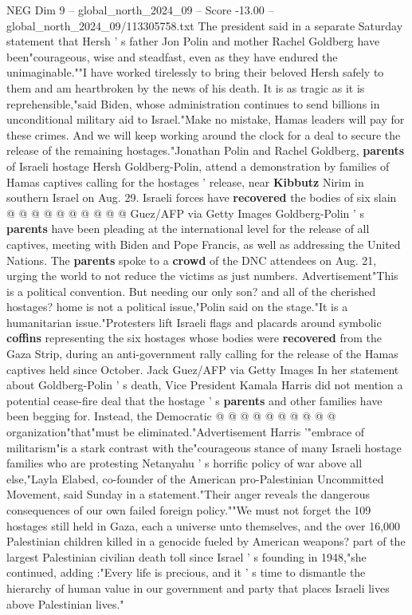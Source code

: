 \begin{textsample}{NEG Dim 9 – global\_north\_2024\_09 – Score -13.00 – global\_north\_2024\_09/113305758.txt}
The president said in a separate Saturday statement that Hersh ' s father Jon Polin and mother Rachel Goldberg have been"courageous, wise and steadfast, even as they have endured the unimaginable.""I have worked tirelessly to bring their beloved Hersh safely to them and am heartbroken by the news of his death.
It is as tragic as it is reprehensible,"said Biden, whose administration continues to send billions in unconditional military aid to Israel."Make no mistake, Hamas leaders will pay for these crimes.
And we will keep working around the clock for a deal to secure the release of the remaining hostages."Jonathan Polin and Rachel Goldberg, \textbf{parents} of Israeli hostage Hersh Goldberg-Polin, attend a demonstration by families of Hamas captives calling for the hostages ' release, near \textbf{Kibbutz} Nirim in southern Israel on Aug. 29.
Israeli forces have \textbf{recovered} the bodies of six slain @ @ @ @ @ @ @ @ @ @ Guez/AFP via Getty Images Goldberg-Polin ' s \textbf{parents} have been pleading at the international level for the release of all captives, meeting with Biden and Pope Francis, as well as addressing the United Nations.
The \textbf{parents} spoke to a \textbf{crowd} of the DNC attendees on Aug. 21, urging the world to not reduce the victims as just numbers.
Advertisement"This is a political convention.
But needing our only son? and all of the cherished hostages? home is not a political issue,"Polin said on the stage."It is a humanitarian issue."Protesters lift Israeli flags and placards around symbolic \textbf{coffins} representing the six hostages whose bodies were \textbf{recovered} from the Gaza Strip, during an anti-government rally calling for the release of the Hamas captives held since October.
Jack Guez/AFP via Getty Images In her statement about Goldberg-Polin ' s death, Vice President Kamala Harris did not mention a potential cease-fire deal that the hostage ' s \textbf{parents} and other families have been begging for.
Instead, the Democratic @ @ @ @ @ @ @ @ @ @ organization"that"must be eliminated."Advertisement Harris '"embrace of militarism"is a stark contrast with the"courageous stance of many Israeli hostage families who are protesting Netanyahu ' s horrific policy of war above all else,"Layla Elabed, co-founder of the American pro-Palestinian Uncommitted Movement, said Sunday in a statement."Their anger reveals the dangerous consequences of our own failed foreign policy.""We must not forget the 109 hostages still held in Gaza, each a universe unto themselves, and the over 16,000 Palestinian children killed in a genocide fueled by American weapons? part of the largest Palestinian civilian death toll since Israel ' s founding in 1948,"she continued, adding :"Every life is precious, and it ' s time to dismantle the hierarchy of human value in our government and party that places Israeli lives above Palestinian lives."

\end{textsample}
